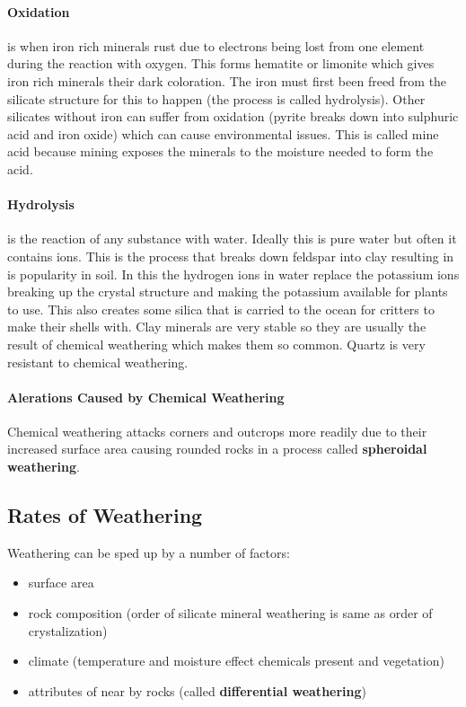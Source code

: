 \documentclass{article}
\begin{document}
\paragraph{Oxidation} %
\label{par:oxidation}
is when iron rich minerals rust due to electrons being lost from one element during the reaction with oxygen.  This forms hematite or limonite which gives iron rich minerals their dark coloration. The iron must first been freed from the silicate structure for this to happen (the process is called hydrolysis). Other silicates without iron can suffer from oxidation (pyrite breaks down into sulphuric acid and iron oxide) which can cause environmental issues. This is called mine acid because mining exposes the minerals to the moisture needed to form the acid.

\paragraph{Hydrolysis} %
\label{par:hydrolysis}
is the reaction of any substance with water. Ideally this is pure water but often it contains ions. This is the process that breaks down feldspar into clay resulting in is popularity in soil. In this the hydrogen ions in water replace the potassium ions breaking up the crystal structure and making the potassium available for plants to use. This also creates some silica that is carried to the ocean for critters to make their shells with. Clay minerals are very stable so they are usually the result of chemical weathering which makes them so common. Quartz is very resistant to chemical weathering.

\paragraph{Alerations Caused by Chemical Weathering} %
\label{par:alerations_caused_by_chemical_weathering}
Chemical weathering attacks corners and outcrops more readily due to their increased surface area causing rounded rocks in a process called \textbf{spheroidal weathering}.

\subsection{Rates of Weathering} %
\label{sub:rates_of_weathering}
Weathering can be sped up by a number of factors:
\begin{itemize}
    \item surface area
    \item rock composition (order of silicate mineral weathering is same as order of crystalization)
    \item climate (temperature and moisture effect chemicals present and vegetation)
    \item attributes of near by rocks (called \textbf{differential weathering})
\end{itemize}
\end{document}
